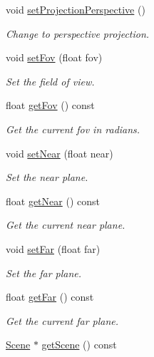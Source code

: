 \begin{DoxyCompactItemize}
void \mbox{\hyperlink{classec_1_1_camera_af3544fbe030aadcd6bdfef8cb94e7b5c}{set\+Projection\+Perspective}} ()
\begin{DoxyCompactList}\small\item\em Change to perspective projection. \end{DoxyCompactList}\item 
void \mbox{\hyperlink{classec_1_1_camera_a1003feebe7df69a508f684c1c67f1388}{set\+Fov}} (float fov)
\begin{DoxyCompactList}\small\item\em Set the field of view. \end{DoxyCompactList}\item 
float \mbox{\hyperlink{classec_1_1_camera_a741cb88974dfd00492315ccf613e8539}{get\+Fov}} () const
\begin{DoxyCompactList}\small\item\em Get the current fov in radians. \end{DoxyCompactList}\item 
void \mbox{\hyperlink{classec_1_1_camera_af0c1f82f4cb2aeb3908b858093080556}{set\+Near}} (float near)
\begin{DoxyCompactList}\small\item\em Set the near plane. \end{DoxyCompactList}\item 
float \mbox{\hyperlink{classec_1_1_camera_a02786d8adecb275e6182cf166b65edb4}{get\+Near}} () const
\begin{DoxyCompactList}\small\item\em Get the current near plane. \end{DoxyCompactList}\item 
void \mbox{\hyperlink{classec_1_1_camera_abdc800333490ec4f890559951340bd08}{set\+Far}} (float far)
\begin{DoxyCompactList}\small\item\em Set the far plane. \end{DoxyCompactList}\item 
float \mbox{\hyperlink{classec_1_1_camera_a6555d47e1c17caf67cf8683b4cbaca4b}{get\+Far}} () const
\begin{DoxyCompactList}\small\item\em Get the current far plane. \end{DoxyCompactList}\item 
\mbox{\hyperlink{classec_1_1_scene}{Scene}} $\ast$ \mbox{\hyperlink{classec_1_1_camera_a33ad8a16eff39b34db86c6dbf2bbabe4}{get\+Scene}} () const

\end{DoxyCompactItemize}
